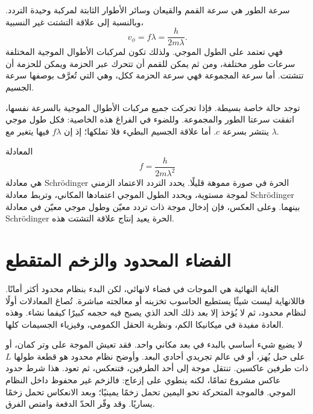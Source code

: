 سرعة الطور هي سرعة القمم والقيعان وسائر الأطوار الثابتة لمركبة وحيدة التردد. وبالنسبة إلى علاقة التشتت غير النسبية،
\begin{equation}
v_\phi=f\lambda=\frac{h}{2m\lambda}.
\end{equation}
فهي تعتمد على الطول الموجي. ولذلك تكون لمركبات الأطوال الموجية المختلفة سرعات طور مختلفة، ومن ثم يمكن للقمم أن تتحرك عبر الحزمة ويمكن للحزمة أن تتشتت. أما سرعة المجموعة فهي سرعة الحزمة ككل، وهي التي تُعرَّف بوصفها سرعة الجسيم.

توجد حالة خاصة بسيطة. فإذا تحركت جميع مركبات الأطوال الموجية بالسرعة نفسها، اتفقت سرعتا الطور والمجموعة. وللضوء في الفراغ هذه الخاصية: فكل طول موجي ينتشر بسرعة \(c\). أما علاقة الجسيم البطيء فلا تملكها؛ إذ إن \(f\lambda\) فيها يتغير مع \(\lambda\).

المعادلة
\begin{equation}
f=\frac{h}{2m\lambda^2}
\end{equation}
هي معادلة Schr\"odinger الحرة في صورة مموهة قليلًا. يحدد التردد الاعتماد الزمني لموجة مستوية، ويحدد الطول الموجي اعتمادها المكاني، وتربط معادلة Schr\"odinger بينهما. وعلى العكس، فإن إدخال موجة ذات تردد معيّن وطول موجي معيّن في معادلة Schr\"odinger الحرة يعيد إنتاج علاقة التشتت هذه.

\begin{classroomqa}
\end{classroomqa}

\section{الفضاء المحدود والزخم المتقطع}

الغاية النهائية هي الموجات في فضاء لانهائي، لكن البدء بنظام محدود أكثر أمانًا. فاللانهاية ليست شيئًا يستطيع الحاسوب تخزينه أو معالجته مباشرة. تُصاغ المعادلات أولًا لنظام محدود، ثم لا يُؤخذ إلا بعد ذلك الحد الذي يصبح فيه حجمه كبيرًا كيفما نشاء. وهذه العادة مفيدة في ميكانيكا الكم، ونظرية الحقل الكمومي، وفيزياء الجسيمات كلها.

لا يضيع شيء أساسي بالبدء في بعد مكاني واحد. فقد تعيش الموجة على وتر كمان، أو على حبل يُهز، أو في عالم تجريدي أحادي البعد. وأوضح نظام محدود هو قطعة طولها \(L\) ذات طرفين عاكسين. تنتقل موجة إلى أحد الطرفين، فتنعكس، ثم تعود. هذا شرط حدود عاكس مشروع تمامًا، لكنه ينطوي على إزعاج: فالزخم غير محفوظ داخل النظام الموجي. فالموجة المتحركة نحو اليمين تحمل زخمًا يمينيًا؛ وبعد الانعكاس تحمل زخمًا يساريًا. وقد وفّر الحدّ الدفعة وامتص الفرق.

